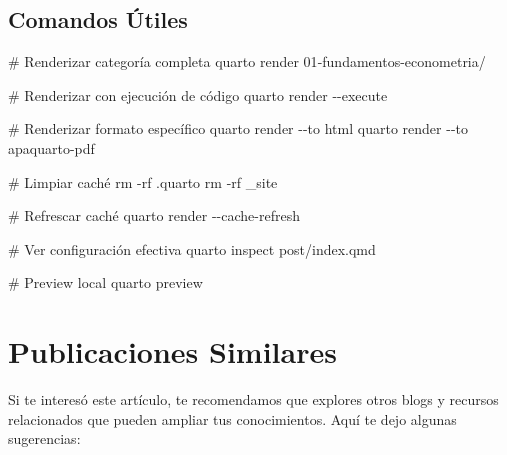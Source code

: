 \documentclass[
  doc,
  floatsintext,
  longtable,
  a4paper,
  nolmodern,
  notxfonts,
  notimes,
  12pt,
  colorlinks=true,linkcolor=blue,citecolor=blue,urlcolor=blue]{apa7}
\newenvironment{Shaded}{\begin{snugshade}}{\end{snugshade}}
\newcommand{\AttributeTok}[1]{\textcolor[rgb]{0.40,0.45,0.13}{#1}}
\newcommand{\CommentTok}[1]{\textcolor[rgb]{0.37,0.37,0.37}{#1}}
\newcommand{\ExtensionTok}[1]{\textcolor[rgb]{0.00,0.23,0.31}{#1}}
\newcommand{\FunctionTok}[1]{\textcolor[rgb]{0.28,0.35,0.67}{#1}}
\newcommand{\NormalTok}[1]{\textcolor[rgb]{0.00,0.23,0.31}{#1}}
\begin{document}
\subsection{Comandos Útiles}\label{comandos-uxfatiles}

\begin{Shaded}
\begin{Highlighting}[]
\CommentTok{\# Renderizar categoría completa}
\ExtensionTok{quarto}\NormalTok{ render 01{-}fundamentos{-}econometria/}

\CommentTok{\# Renderizar con ejecución de código}
\ExtensionTok{quarto}\NormalTok{ render }\AttributeTok{{-}{-}execute}

\CommentTok{\# Renderizar formato específico}
\ExtensionTok{quarto}\NormalTok{ render }\AttributeTok{{-}{-}to}\NormalTok{ html}
\ExtensionTok{quarto}\NormalTok{ render }\AttributeTok{{-}{-}to}\NormalTok{ apaquarto{-}pdf}

\CommentTok{\# Limpiar caché}
\FunctionTok{rm} \AttributeTok{{-}rf}\NormalTok{ .quarto}
\FunctionTok{rm} \AttributeTok{{-}rf}\NormalTok{ \_site}

\CommentTok{\# Refrescar caché}
\ExtensionTok{quarto}\NormalTok{ render }\AttributeTok{{-}{-}cache{-}refresh}

\CommentTok{\# Ver configuración efectiva}
\ExtensionTok{quarto}\NormalTok{ inspect post/index.qmd}

\CommentTok{\# Preview local}
\ExtensionTok{quarto}\NormalTok{ preview}
\end{Highlighting}
\end{Shaded}

\section{Publicaciones Similares}\label{publicaciones-similares}

Si te interesó este artículo, te recomendamos que explores otros blogs y
recursos relacionados que pueden ampliar tus conocimientos. Aquí te dejo
algunas sugerencias:
\end{document}
